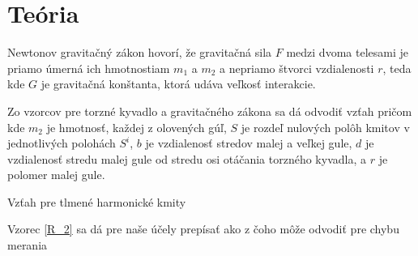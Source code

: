 \section{Teória}
Newtonov gravitačný zákon hovorí, že gravitačná sila $F$ medzi dvoma telesami je priamo úmerná ich hmotnostiam $m_1$ a $m_2$ a nepriamo štvorci vzdialenosti $r$, teda
kde $G$ je gravitačná konštanta, ktorá udáva veľkosť interakcie.

Zo vzorcov pre torzné kyvadlo a gravitačného zákona sa dá odvodiť vzťah
 pričom 
kde $m_2$ je hmotnosť, každej z olovených gúľ, 
$S$ je rozdeľ nulových polôh kmitov v jednotlivých polohách $S^i$,
$b$ je vzdialenosť stredov malej a veľkej gule,
$d$ je vzdialenosť stredu malej gule od stredu osi otáčania torzného kyvadla,
a $r$ je polomer malej gule.
 
Vzťah pre tlmené harmonické kmity




Vzorec \ref{R_2} sa dá pre naše účely prepísať ako  z čoho môže odvodiť pre chybu merania

